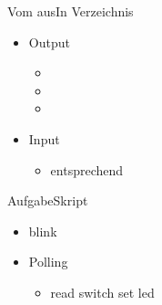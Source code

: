 \begin{frame}{Vom \usp aus}{In Verzeichnis }
\begin{itemize}
 \item Output 
 \begin{itemize}
 \item {}
 \item {}
 \item {} 
 \end{itemize}
 \item Input 
 \begin{itemize}
  \item entsprechend
 \end{itemize} 
\end{itemize}
\end{frame}

\begin{frame}{Aufgabe}{Skript}
 \begin{itemize}
  \item blink
  \item Polling
  \begin{itemize}
   \item read switch set led
  \end{itemize}
 \end{itemize}
\end{frame}

